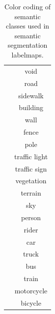 


\begin{table}
	\centering
	\begin{tabular}{cc}
		\raisebox{-.25\height}{\textcolor{black}{\rule{0.5cm}{0.5cm}}} & void \\
		\raisebox{-.25\height}{\textcolor{purple}{\rule{0.5cm}{0.5cm}}} & road \\
		\raisebox{-.25\height}{\textcolor{lightpurple}{\rule{0.5cm}{0.5cm}}} & sidewalk \\
		\raisebox{-.25\height}{\textcolor{grey}{\rule{0.5cm}{0.5cm}}} & building \\
		\raisebox{-.25\height}{\textcolor{bluepurple}{\rule{0.5cm}{0.5cm}}} & wall \\
		\raisebox{-.25\height}{\textcolor{darkerskin}{\rule{0.5cm}{0.5cm}}} & fence \\
		\raisebox{-.25\height}{\textcolor{grey2}{\rule{0.5cm}{0.5cm}}} & pole \\
		\raisebox{-.25\height}{\textcolor{orange}{\rule{0.5cm}{0.5cm}}} & traffic light \\
		\raisebox{-.25\height}{\textcolor{lightgreen}{\rule{0.5cm}{0.5cm}}} & traffic sign \\
		\raisebox{-.25\height}{\textcolor{green}{\rule{0.5cm}{0.5cm}}} & vegetation \\
		\raisebox{-.25\height}{\textcolor{brightgreen}{\rule{0.5cm}{0.5cm}}} & terrain \\
		\raisebox{-.25\height}{\textcolor{blue}{\rule{0.5cm}{0.5cm}}} & sky \\
		\raisebox{-.25\height}{\textcolor{red}{\rule{0.5cm}{0.5cm}}} & person \\
		\raisebox{-.25\height}{\textcolor{fullred}{\rule{0.5cm}{0.5cm}}} & rider \\
		\raisebox{-.25\height}{\textcolor{darkblue}{\rule{0.5cm}{0.5cm}}} & car \\
		\raisebox{-.25\height}{\textcolor{blueblack}{\rule{0.5cm}{0.5cm}}} & truck \\
		\raisebox{-.25\height}{\textcolor{paleblue}{\rule{0.5cm}{0.5cm}}} & bus \\
		\raisebox{-.25\height}{\textcolor{palegreenblue}{\rule{0.5cm}{0.5cm}}} & train \\
		\raisebox{-.25\height}{\textcolor{brightblue}{\rule{0.5cm}{0.5cm}}} & motorcycle\\
		\raisebox{-.25\height}{\textcolor{brownred}{\rule{0.5cm}{0.5cm}}} & bicycle
	\end{tabular} 
	\caption{Color coding of semantic classes used in semantic segmentation labelmaps.}
	\label{table:semseg_colors}
\end{table}


